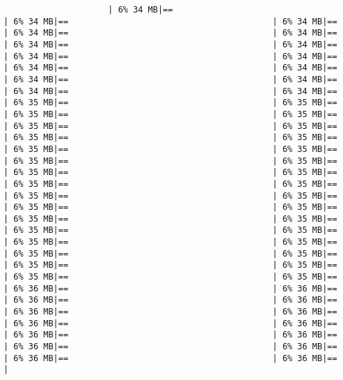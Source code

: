 \documentclass[
]{article}
\begin{document}
\begin{verbatim}
                     | 6% 34 MB|==                                         | 6% 34 MB|==                                         | 6% 34 MB|==                                         | 6% 34 MB|==                                         | 6% 34 MB|==                                         | 6% 34 MB|==                                         | 6% 34 MB|==                                         | 6% 34 MB|==                                         | 6% 34 MB|==                                         | 6% 34 MB|==                                         | 6% 34 MB|==                                         | 6% 34 MB|==                                         | 6% 34 MB|==                                         | 6% 34 MB|==                                         | 6% 34 MB|==                                         | 6% 35 MB|==                                         | 6% 35 MB|==                                         | 6% 35 MB|==                                         | 6% 35 MB|==                                         | 6% 35 MB|==                                         | 6% 35 MB|==                                         | 6% 35 MB|==                                         | 6% 35 MB|==                                         | 6% 35 MB|==                                         | 6% 35 MB|==                                         | 6% 35 MB|==                                         | 6% 35 MB|==                                         | 6% 35 MB|==                                         | 6% 35 MB|==                                         | 6% 35 MB|==                                         | 6% 35 MB|==                                         | 6% 35 MB|==                                         | 6% 35 MB|==                                         | 6% 35 MB|==                                         | 6% 35 MB|==                                         | 6% 35 MB|==                                         | 6% 35 MB|==                                         | 6% 35 MB|==                                         | 6% 35 MB|==                                         | 6% 35 MB|==                                         | 6% 35 MB|==                                         | 6% 35 MB|==                                         | 6% 35 MB|==                                         | 6% 35 MB|==                                         | 6% 35 MB|==                                         | 6% 35 MB|==                                         | 6% 35 MB|==                                         | 6% 36 MB|==                                         | 6% 36 MB|==                                         | 6% 36 MB|==                                         | 6% 36 MB|==                                         | 6% 36 MB|==                                         | 6% 36 MB|==                                         | 6% 36 MB|==                                         | 6% 36 MB|==                                         | 6% 36 MB|==                                         | 6% 36 MB|==                                         | 6% 36 MB|==                                         | 6% 36 MB|==                                         | 6% 36 MB|==                                         | 6% 36 MB|==                                         | 
\end{verbatim}
\end{document}
